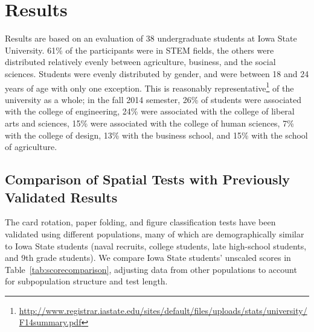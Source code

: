 \documentclass[journal]{vgtc}\usepackage[]{graphicx}\usepackage[]{color}
\begin{document}
\section{Results}\label{sec:results}
Results are based on an evaluation of 38 undergraduate students at Iowa State University. 61\% of the participants were in STEM fields, the others were distributed relatively evenly between agriculture, business, and the social sciences. Students were evenly distributed by gender, and were between 18 and 24 years of age with only one exception. This is reasonably representative\footnote{\url{http://www.registrar.iastate.edu/sites/default/files/uploads/stats/university/F14summary.pdf}} of the university as a whole; in the fall 2014 semester, 26\% of students were associated with the college of engineering, 24\% were associated with the college of liberal arts and sciences, 15\% were associated with the college of human sciences, 7\% with the college of design, 13\% with the business school, and 15\% with the school of agriculture.  

\subsection{Comparison of Spatial Tests with Previously Validated Results}
The card rotation, paper folding, and figure classification tests have been validated using different populations, many of which are demographically similar to Iowa State students (naval recruits, college students, late high-school students, and 9th grade students). We compare Iowa State students' unscaled scores in Table~\ref{tab:scorecomparison}, adjusting data from other populations to account for subpopulation structure and test length. 
\end{document}
